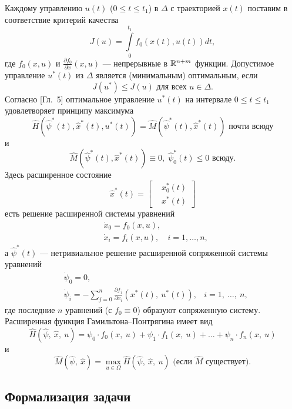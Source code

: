 Каждому управлению $u(t)$ ($0 \leqslant t \leqslant t_1$) в $\Delta$ с траекторией $x(t)$ поставим в соответствие критерий качества
$$
        J(u) = \int\limits_0^{t_1} f_0(x(t), u(t)) dt,
$$
где $f_0(x, u)$ и $\frac{\partial f_0}{\partial x}(x, u)$ --- непрерывные в $\mathbb{R}^{n+m}$ функции. Допустимое управление $u^*(t)$ из $\Delta$ является (минимальным) оптимальным, если
$$
        J(u^*) \leqslant J(u) \mbox{ для всех } u \in \Delta.
$$
Согласно \cite{li}[Гл.~5] оптимальное управление $u^*(t)$ на интервале $0 \leqslant t \leqslant t_1$ удовлетворяет принципу максимума
$$
        \hat{H}(\hat{\psi}^*(t), \hat{x}^*(t), u^*(t)) = \hat{M}(\hat{\psi}^*(t), \hat{x}^*(t)) \mbox{ почти всюду}
$$
и
$$
        \hat{M}(\hat{\psi}^*(t), \hat{x}^*(t)) \equiv 0,\; \hat{\psi}^*_0(t) \leqslant 0 \mbox{ всюду.}
$$
Здесь расширенное состояние
$$
        \hat{x}^*(t) =
        \left[
        \begin{aligned}
                &x_0^* (t) \\
                &x^*   (t)
        \end{aligned}
        \right]
$$
есть решение расширенной системы уравнений
$$
        \begin{aligned}
                &\dot x_0 = f_0(x, u),&\\
                &\dot x_i = f_i(x, u),  &i = 1, \ldots, n,
        \end{aligned}
$$
а $\hat\psi^*(t)$ --- нетривиальное решение расширенной сопряженной системы уравнений
$$
        \begin{aligned}
                &\dot\psi_0 = 0, \\
                &\dot\psi_i = - \sum\limits_{j=0}^{n}\frac{\partial f_j}{\partial x_i}(x^*(t),\: u^*(t)), & i = 1,\: \ldots ,\: n,
        \end{aligned}
$$
где последние $n$ уравнений (с $f_0 \equiv 0$) образуют сопряженную систему. Расширенная функция Гамильтона--Понтрягина имеет вид
$$
        \hat H (\hat\psi,\: \hat x,\: u) = \psi_0 \cdot f_0(x,\: u) + \psi_1 \cdot f_1(x,\: u) + \ldots + \psi_n \cdot f_n(x,\: u)
$$
и
$$
        \hat M (\hat\psi,\: \hat x) = \max\limits_{u \in \Omega}\hat H (\hat\psi,\:\hat x,\: u) \mbox{ (если $\hat M$ существует).}
$$

\subsection{Формализация задачи}

